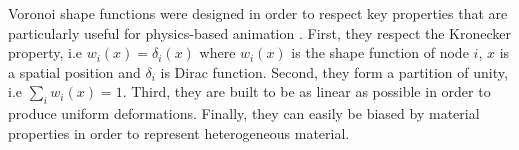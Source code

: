 \documentclass[11pt, oneside, a4paper]{memoir}
\begin{document}
Voronoi shape functions were designed in order to respect key properties that are particularly useful for physics-based animation \cite{Faure2011} . First, they respect the Kronecker property, i.e $w_{i}(x) = \delta_{i}(x)$ where $w_{i}(x)$ is the shape function of node $i$, $x$ is a spatial position and $\delta_{i}$ is Dirac function. Second, they form a partition of unity, i.e $\sum_{i}w_{i}(x) = 1$. Third, they are built to be as linear as possible in order to produce uniform deformations. Finally, they can easily be biased by material properties in order to represent heterogeneous material.

\end{document}
